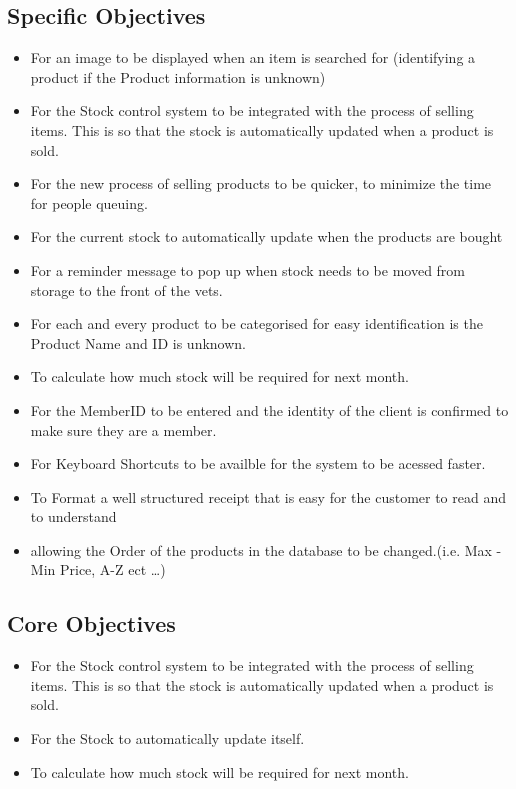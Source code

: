 \subsection{Specific Objectives}

\begin{flushleft}
\begin{itemize}
\item For an image to be displayed when an item is searched for (identifying a product if the Product information is unknown)
\item For the Stock control system to be integrated with the process of selling items. This is so that the stock is automatically updated when a product is sold.
\item For the new process of selling products to be quicker, to minimize the time for people queuing. 
\item For the current stock to automatically update when the products are bought
\item For a reminder message to pop up when stock needs to be moved from storage to the front of the vets. 
\item For each and every product to be categorised for easy identification is the Product Name and ID is unknown.
\item To calculate how much stock will be required for next month.
\item For the MemberID to be entered and the identity of the client is confirmed to make sure they are a member.
\item For Keyboard Shortcuts to be availble for the system to be acessed faster.
\item To Format a well structured receipt that is easy for the customer to read and to understand
\item allowing the Order of the products in the database to be changed.(i.e. Max - Min Price, A-Z ect \ldots)
\end{itemize}
\end{flushleft}

\subsection{Core Objectives}

\begin{flushleft}
\begin{itemize}
\item For the Stock control system to be integrated with the process of selling items. This is so that the stock is automatically updated when a product is sold.
\item For the Stock to automatically update itself.
\item To calculate how much stock will be required for next month.
\end{itemize}
\end{flushleft}

